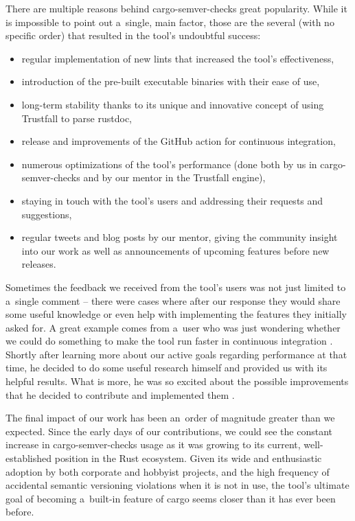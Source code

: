 \documentclass[licencjacka,en]{pracamgr}
\begin{document}
There are multiple reasons behind cargo-semver-checks great popularity. While it
is impossible to point out a~single, main factor, those are the several (with no specific order)
that resulted in the tool's undoubtful success:
\begin{itemize}
	\item regular implementation of new lints that increased the tool's effectiveness,
	\item introduction of the pre-built executable binaries with their ease of use,
	\item long-term stability thanks to its unique and innovative concept of using Trustfall
		to parse rustdoc,
	\item release and improvements of the GitHub action for continuous integration,
	\item numerous optimizations of the tool's performance (done both by us in
		cargo-semver-checks and by our mentor in the Trustfall engine),
	\item staying in touch with the tool's users and addressing their requests and suggestions,
	\item regular tweets and blog posts by our mentor, giving the community insight into our work
		as well as announcements of upcoming features before new releases.
\end{itemize}

Sometimes the feedback we received from the tool's users was not just limited to a~single comment
-- there were cases where after our response they would share some useful
knowledge or even help with implementing the features they initially asked for. A great example
comes from a~user who was just wondering whether we could do something to make the tool run faster
in continuous integration \cite{make-ci-runs-faster}. Shortly after learning more about our active
goals regarding performance at that time, he decided to do some useful research himself
and provided us with its helpful results. What is more, he was so excited about the possible
improvements that he decided to contribute and implemented them \cite{user-contribution-1}.

The final impact of our work has been an~order of magnitude greater than we expected.
Since the early days of our contributions, we could see the constant increase
in cargo-semver-checks usage as it was growing to its current, well-established position in
the Rust ecosystem. Given its wide and enthusiastic adoption by both corporate and hobbyist
projects, and the high frequency of accidental semantic versioning violations when it is not
in use, the tool's ultimate goal of becoming a~built-in feature of cargo seems closer than it has
ever been before.
\end{document}
